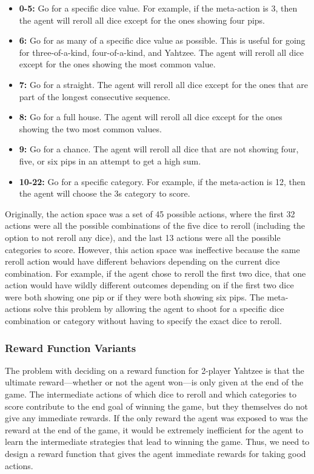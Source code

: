 \documentclass[12pt]{article}
\begin{document}
\begin{itemize}
    \item \textbf{0-5:} Go for a specific dice value. For example, if the meta-action is 3, then the agent will reroll all dice except for the ones showing four pips.
    \item \textbf{6:} Go for as many of a specific dice value as possible. This is useful for going for three-of-a-kind, four-of-a-kind, and Yahtzee. The agent will reroll all dice except for the ones showing the most common value.
    \item \textbf{7:} Go for a straight. The agent will reroll all dice except for the ones that are part of the longest consecutive sequence.
    \item \textbf{8:} Go for a full house. The agent will reroll all dice except for the ones showing the two most common values.
    \item \textbf{9:} Go for a chance. The agent will reroll all dice that are not showing four, five, or six pips in an attempt to get a high sum.
    \item \textbf{10-22:} Go for a specific category. For example, if the meta-action is 12, then the agent will choose the 3s category to score.
\end{itemize}

\noindent
Originally, the action space was a set of 45 possible actions, where the first 32 actions were all the possible combinations of the five dice to reroll (including the option to not reroll any dice), and the last 13 actions were all the possible categories to score. However, this action space was ineffective because the same reroll action would have different behaviors depending on the current dice combination. For example, if the agent chose to reroll the first two dice, that one action would have wildly different outcomes depending on if the first two dice were both showing one pip or if they were both showing six pips. The meta-actions solve this problem by allowing the agent to shoot for a specific dice combination or category without having to specify the exact dice to reroll.

\subsubsection{Reward Function Variants}
The problem with deciding on a reward function for 2-player Yahtzee is that the ultimate reward—whether or not the agent won—is only given at the end of the game. The intermediate actions of which dice to reroll and which categories to score contribute to the end goal of winning the game, but they themselves do not give any immediate rewards. If the only reward the agent was exposed to was the reward at the end of the game, it would be extremely inefficient for the agent to learn the intermediate strategies that lead to winning the game. Thus, we need to design a reward function that gives the agent immediate rewards for taking good actions.
\end{document}
